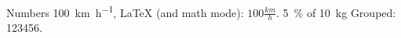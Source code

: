 \documentclass{IEEEtran}
\begin{document}
Numbers \SI{100}{\km\per\hour},
\LaTeX{} (and math mode):
$100 \frac{\mathit{km}}{h}$.
\SI{5}{\percent} of \SI{10}{kg}
Grouped: \num{123456}.
\end{document}

